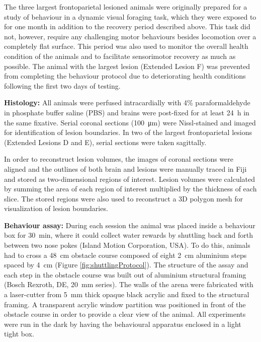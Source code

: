 The three largest frontoparietal lesioned animals were originally prepared for a study of behaviour in a dynamic visual foraging task, which they were exposed to for one month in addition to the recovery period described above. This task did not, however, require any challenging motor behaviours besides locomotion over a completely flat surface. This period was also used to monitor the overall health condition of the animals and to facilitate sensorimotor recovery as much as possible. The animal with the largest lesion (Extended Lesion F) was prevented from completing the behaviour protocol due to deteriorating health conditions following the first two days of testing.

\textbf{Histology:} All animals were perfused intracardially with 4\% paraformal\-dehyde in phosphate buffer saline (PBS) and brains were post-fixed for at least \SI{24}{\hour} in the same fixative. Serial coronal sections (\SI{100}{\micro\meter}) were Nissl-stained and imaged for identification of lesion boundaries. In two of the largest frontoparietal lesions (Extended Lesions D and E), serial sections were taken sagittally.

In order to reconstruct lesion volumes, the images of coronal sections were aligned and the outlines of both brain and lesions were manually traced in Fiji \cite{Schindelin2012} and stored as two-dimensional regions of interest. Lesion volumes were calculated by summing the area of each region of interest multiplied by the thickness of each slice. The stored regions were also used to reconstruct a 3D polygon mesh for visualization of lesion boundaries.

\textbf{Behaviour assay:} During each session the animal was placed inside a behaviour box for \SI{30}{\minute}, where it could collect water rewards by shuttling back and forth between two nose pokes (Island Motion Corporation, USA). To do this, animals had to cross a \SI{48}{\centi\meter} obstacle course composed of eight \SI{2}{\centi\meter} aluminium steps spaced by \SI{4}{\centi\meter} (Figure \ref{fig:shuttlingProtocol}). The structure of the assay and each step in the obstacle course was built out of aluminium structural framing (Bosch Rexroth, DE, \SI{20}{\milli\meter} series). The walls of the arena were fabricated with a laser-cutter from \SI{5}{\milli\meter} thick opaque black acrylic and fixed to the structural framing. A transparent acrylic window partition was positioned in front of the obstacle course in order to provide a clear view of the animal. All experiments were run in the dark by having the behavioural apparatus enclosed in a light tight box.

